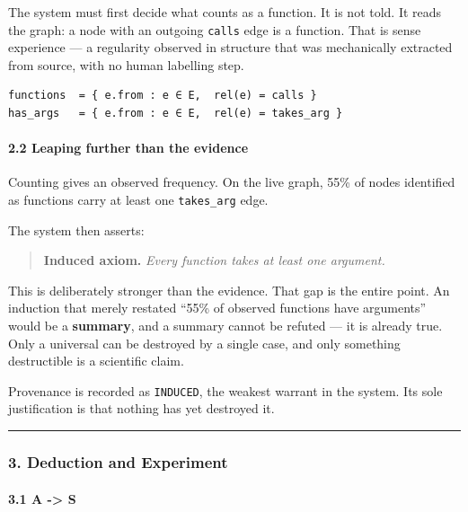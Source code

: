 \documentclass[
  11pt,
  a4paper,
]{article}
\begin{document}
The system must first decide what counts as a function. It is not told.
It reads the graph: a node with an outgoing \texttt{calls} edge is a
function. That is sense experience --- a regularity observed in
structure that was mechanically extracted from source, with no human
labelling step.

\begin{verbatim}
functions  = { e.from : e ∈ E,  rel(e) = calls }
has_args   = { e.from : e ∈ E,  rel(e) = takes_arg }
\end{verbatim}

\paragraph{2.2 Leaping further than the
evidence}\label{leaping-further-than-the-evidence}

Counting gives an observed frequency. On the live graph, 55\% of nodes
identified as functions carry at least one \texttt{takes\_arg} edge.

The system then asserts:

\begin{quote}
\textbf{Induced axiom.} \emph{Every function takes at least one
argument.}
\end{quote}

This is deliberately stronger than the evidence. That gap is the entire
point. An induction that merely restated ``55\% of observed functions
have arguments'' would be a \textbf{summary}, and a summary cannot be
refuted --- it is already true. Only a universal can be destroyed by a
single case, and only something destructible is a scientific claim.

Provenance is recorded as \texttt{INDUCED}, the weakest warrant in the
system. Its sole justification is that nothing has yet destroyed it.

\begin{center}\rule{0.5\linewidth}{0.5pt}\end{center}

\subsubsection{3. Deduction and
Experiment}\label{deduction-and-experiment}

\paragraph{3.1 A -\textgreater{} S}\label{a---s}
\end{document}
